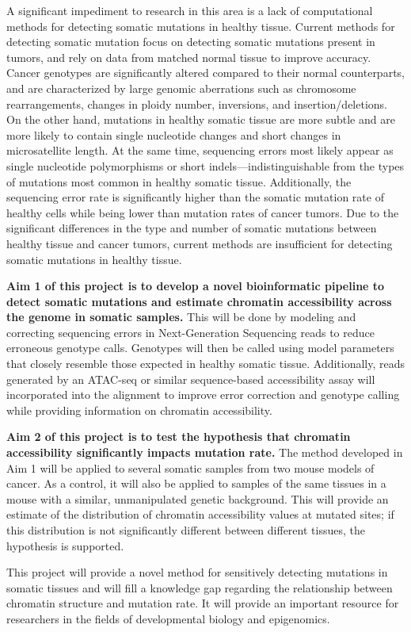 A significant impediment to research in this area is a lack of computational methods for detecting somatic mutations in healthy tissue.
Current methods for detecting somatic mutation focus on detecting somatic mutations present in tumors, and rely on data from matched normal tissue to improve accuracy.
Cancer genotypes are significantly altered compared to their normal counterparts, and are characterized by large genomic aberrations such as chromosome rearrangements, changes in ploidy number, inversions, and insertion/deletions.
On the other hand, mutations in healthy somatic tissue are more subtle and are more likely to contain single nucleotide changes and short changes in microsatellite length.
At the same time, sequencing errors most likely appear as single nucleotide polymorphisms or short indels---indistinguishable from the types of mutations most common in healthy somatic tissue.
Additionally, the sequencing error rate is significantly higher than the somatic mutation rate of healthy cells while being lower than mutation rates of cancer tumors.
Due to the significant differences in the type and number of somatic mutations between healthy tissue and cancer tumors, current methods are insufficient for detecting somatic mutations in healthy tissue.

\textbf{Aim 1 of this project is to develop a novel bioinformatic pipeline to detect somatic mutations and estimate chromatin accessibility across the genome in somatic samples.}
This will be done by modeling and correcting sequencing errors in Next-Generation Sequencing reads to reduce erroneous genotype calls. Genotypes will then be called using model parameters that closely resemble those expected in healthy somatic tissue.
Additionally, reads generated by an ATAC-seq or similar sequence-based accessibility assay will incorporated into the alignment to improve error correction and genotype calling while providing information on chromatin accessibility.

\textbf{Aim 2 of this project is to test the hypothesis that chromatin accessibility significantly impacts mutation rate.}
The method developed in Aim 1 will be applied to several somatic samples from two mouse models of cancer.
As a control, it will also be applied to samples of the same tissues in a mouse with a similar, unmanipulated genetic background.
This will provide an estimate of the distribution of chromatin accessibility values at mutated sites; if this distribution is not significantly different between different tissues, the hypothesis is supported.

This project will provide a novel method for sensitively detecting  mutations in somatic tissues and will fill a knowledge gap regarding the relationship between chromatin structure and mutation rate. It will provide an important resource for researchers in the fields of developmental biology and epigenomics.
